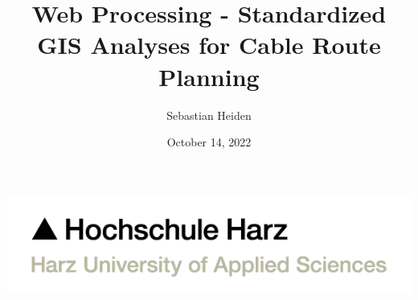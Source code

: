\documentclass[usenames,dvipsnames,aspectratio=169]{beamer}
\title{Web Processing - Standardized GIS Analyses for Cable Route Planning}
\author{Sebastian Heiden}
\institute{Harz University of Applied Sciences}
\date{October 14, 2022}
\begin{document}
    

\begin{frame}[plain]
	\includegraphics[scale=0.21]{images/3-HSH-Logo-RGB-en.png}
    \maketitle
\end{frame}
\end{document}
